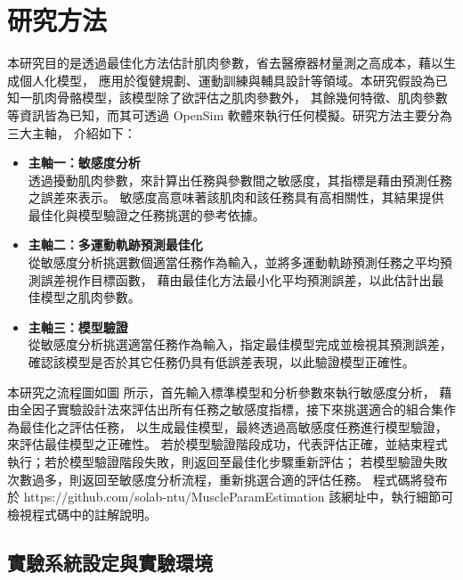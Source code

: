 \chapter{研究方法}
\fontsize{12pt}{18pt}\selectfont

本研究目的是透過最佳化方法估計肌肉參數，省去醫療器材量測之高成本，藉以生成個人化模型，
應用於復健規劃、運動訓練與輔具設計等領域。本研究假設為已知一肌肉骨骼模型，該模型除了欲評估之肌肉參數外，
其餘幾何特徵、肌肉參數等資訊皆為已知，而其可透過 OpenSim 軟體來執行任何模擬。研究方法主要分為三大主軸，
介紹如下：
\begin{itemize}
    \item \textbf{主軸一：敏感度分析}
    \\ 透過擾動肌肉參數，來計算出任務與參數間之敏感度，其指標是藉由預測任務之誤差來表示。
       敏感度高意味著該肌肉和該任務具有高相關性，其結果提供最佳化與模型驗證之任務挑選的參考依據。
    \item \textbf{主軸二：多運動軌跡預測最佳化}
    \\ 從敏感度分析挑選數個適當任務作為輸入，並將多運動軌跡預測任務之平均預測誤差視作目標函數，
       藉由最佳化方法最小化平均預測誤差，以此估計出最佳模型之肌肉參數。   
    \item \textbf{主軸三：模型驗證}
    \\ 從敏感度分析挑選適當任務作為輸入，指定最佳模型完成並檢視其預測誤差，
       確認該模型是否於其它任務仍具有低誤差表現，以此驗證模型正確性。
\end{itemize}

本研究之流程圖如圖 所示，首先輸入標準模型和分析參數來執行敏感度分析，
藉由全因子實驗設計法來評估出所有任務之敏感度指標，接下來挑選適合的組合集作為最佳化之評估任務，
以生成最佳模型，最終透過高敏感度任務進行模型驗證，來評估最佳模型之正確性。
若於模型驗證階段成功，代表評估正確，並結束程式執行；若於模型驗證階段失敗，則返回至最佳化步驟重新評估；
若模型驗證失敗次數過多，則返回至敏感度分析流程，重新挑選合適的評估任務。
程式碼將發布於 https://github.com/solab-ntu/MuscleParamEstimation 該網址中，執行細節可檢視程式碼中的註解說明。

\clearpage

\section{實驗系統設定與實驗環境}

